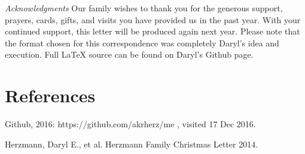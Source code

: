 \documentclass[letterpaper,11pt]{article}
\def\refer{\par\noindent\hangindent\parindent\hangafter1}
\begin{document}
\begin{multicols}{2}
\bigskip
  \emph{Acknowledgments} Our family wishes to thank you for the generous 
support, prayers, cards, gifts, and visits you have provided us in the past
year. With your continued support, this letter will be produced again
next year. Please note that the format chosen for this correspondence was
completely Daryl's idea and execution. Full \LaTeX\xspace source can be found on 
Daryl's Github page.

\section{References}

\refer Github, 2016: https://github.com/akrherz/me , visited 17 Dec 2016.
\refer Herzmann, Daryl E., et al. Herzmann Family Christmas Letter 2014. 

\end{multicols}
\end{document}
